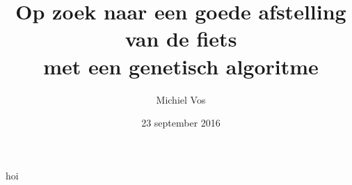 \documentclass{beamer}
\title{Op zoek naar een goede afstelling van de fiets\\
met een genetisch algoritme}
\author{Michiel Vos}
\date{23 september 2016}
\begin{document}
\begin{frame}
  \titlepage
\end{frame}

hoi
\end{document}
